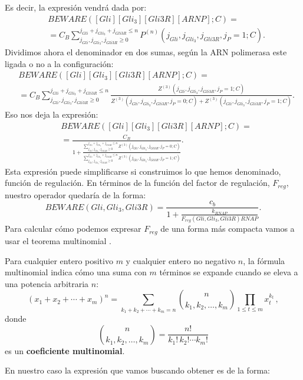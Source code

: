 Es decir, la expresión vendrá dada por: 
\begin{equation}
\begin{split}
&BEWARE([Gli][Gli_3][Gli3R][ARNP];C)=\\&=C_B\sum_{j_{Gli}, j_{Gli_3}, j_{Gli3R}\geq0}^{j_{Gli}+ j_{Gli_3}+ j_{Gli3R}\leq n}P^{(n)}(j_{Gli}, j_{Gli_3}, j_{Gli3R},j_P=1;C).
\end{split}
\end{equation}
Dividimos ahora el denominador en dos sumas, según la ARN polimerasa este ligada o no a la configuración:
\begin{equation}
\begin{split}
&BEWARE([Gli][Gli_3][Gli3R][ARNP];C)=\\&=C_B\sum_{j_{Gli}, j_{Gli_3}, j_{Gli3R}\geq0}^{j_{Gli}+ j_{Gli_3}+ j_{Gli3R}\leq n}\frac{Z^{(3)}(j_{Gli}, j_{Gli_3}, j_{Gli3R},j_P=1;C)}{Z^{(3)}(j_{Gli}, j_{Gli_3}, j_{Gli3R},j_P=0;C)+Z^{(3)}(j_{Gli}, j_{Gli_3}, j_{Gli3R},j_P=1;C)}.
\end{split}
\end{equation}
Eso nos deja la expresión:
\begin{equation}
\begin{split}
&BEWARE([Gli][Gli_3][Gli3R][ARNP];C)=\\&=\frac{C_B}{1+\frac{\sum_{j_{Gli}, j_{Gli_3}, j_{Gli3R}\geq0}^{j_{Gli}+ j_{Gli_3}+ j_{Gli3R}\leq n}Z^{(3)}(j_{Gli}, j_{Gli_3}, j_{Gli3R},j_P=0;C)}{\sum_{j_{Gli}, j_{Gli_3}, j_{Gli3R}\geq0}^{j_{Gli}+ j_{Gli_3}+ j_{Gli3R}\leq n}Z^{(3)}(j_{Gli}, j_{Gli_3}, j_{Gli3R},j_P=1;C)}}.
\end{split}
\end{equation}
Esta expresión puede simplificarse si construimos lo que hemos denominado, función de regulación. En términos de la función del factor de regulación, $F_{reg}$, nuestro operador quedaría de la forma:
\begin{equation}
BEWARE(Gli, Gli_3, Gli3R)=\frac{c_{b}}{1 + \frac{k_{RNAP}}{F_{reg}(Gli, Gli_3, Gli3R) RNAP}}.
\end{equation}
Para calcular cómo podemos expresar $F_{reg}$ de una forma más compacta vamos a usar el teorema multinomial \cite{hall1998combinatorial}.
\begin{theorem}
	Para cualquier entero positivo $m$ y cualquier entero no negativo $n$, la fórmula multinomial indica cómo una suma con $m$ términos se expande cuando se eleva a una potencia arbitraria $n$:
	$$(x_1 + x_2  + \cdots + x_m)^n 
	= \sum_{k_1+k_2+\cdots+k_m=n} {n \choose k_1, k_2, \ldots, k_m}
	\prod_{1\le t\le m}x_{t}^{k_{t}}\,,$$
	donde
	$$ {n \choose k_1, k_2, \ldots, k_m}
	= \frac{n!}{k_1!\, k_2! \cdots k_m!}$$
	es un \textbf{coeficiente multinomial}.
\end{theorem}
En nuestro caso la expresión que vamos buscando obtener es de la forma: 

